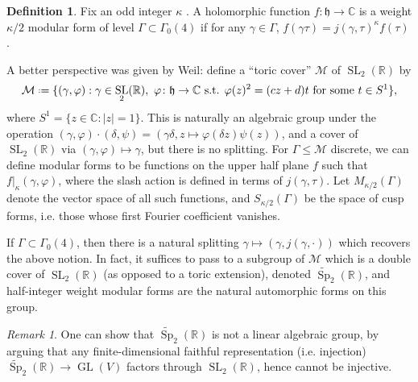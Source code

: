 \documentclass[11pt,a4paper,leqno]{article}
\let\mc\mathcal
\let\mf\mathfrak
\newcommand{\1}{\mathbbm{1}}
\newcommand{\R}{\mathbb{R}}
\newcommand{\C}{\mathbb{C}}
\newcommand*{\defeq}{\mathrel{\vcenter{\baselineskip0.5ex \lineskiplimit0pt
      \hbox{\scriptsize.}\hbox{\scriptsize.}}}%
  =}
\renewcommand{\phi}{\varphi}
\DeclareMathOperator{\SL}{SL}
\DeclareMathOperator{\Sp}{Sp}
\newcommand{\SpC}{\widetilde{\operatorname{\Sp}}}
\DeclareMathOperator{\GL}{GL}
\theoremstyle{plain}
\theoremstyle{definition}
\newtheorem{definition}[theorem]{Definition}
\theoremstyle{remark}
\newtheorem*{remark}{Remark}
\numberwithin{equation}{section}
\begin{document}
\begin{definition}
  Fix an odd integer $\kappa$ . A holomorphic function $f \colon \mf h \to \C$
  is a weight $\kappa/2$ modular form of level $\Gamma \subset \Gamma_{0}(4)$ if for any $\gamma
  \in \Gamma$, $f(\gamma \tau) = j(\gamma,\tau)^{\kappa} f(\tau)$. 
\end{definition}

A better perspective was given by Weil: define a ``toric cover''
$\mc M$ of $\SL_{2}(\R)$ by
\begin{equation}
  \label{eq:3}
\mc M \defeq \{(\gamma, \phi) : \gamma \in \SL_{2}(\R),\ \phi \colon \mf h \to \C \text{
  s.t. } \phi(z)^{2} = (cz+d)t \text{ for some } t \in S^{1}\},
\end{equation}
where $S^{1} = \{z \in \C : |z| = 1\}$. This is naturally an algebraic
group under the operation
$(\gamma,\phi) \cdot (\delta,\psi) = (\gamma \delta, z\mapsto \phi(\delta z)\psi(z))$, and a cover of
$\SL_{2}(\R)$ via $(\gamma,\phi) \mapsto \gamma$, but there is no splitting. For
$\Gamma \le \mc M$ discrete, we can define modular forms to be functions on
the upper half plane $f$ such that $f|_{\kappa}(\gamma,\phi)$, where the slash
action is defined in terms of $j(\gamma,\tau)$. Let
$M_{\kappa/2}(\Gamma)$ denote the vector space of all such functions, and
$S_{\kappa/2}(\Gamma)$ be the space of cusp forms, i.e. those whose first
Fourier coefficient vanishes.

If $\Gamma \subset \Gamma_{0}(4)$, then there is a natural splitting
$\gamma \mapsto (\gamma, j(\gamma,\cdot))$ which recovers the above notion. In fact, it
suffices to pass to a subgroup of $\mc M$ which is a double cover of
$\SL_{2}(\R)$ (as opposed to a toric extension), denoted
$\SpC_{2}(\R)$, and half-integer weight modular forms are
the natural automorphic forms on this group.

\begin{remark}
  One can show that $\SpC_{2}(\R)$ is not a linear
  algebraic group, by arguing that any finite-dimensional faithful
  representation (i.e. injection) $\SpC_{2}(\R) \to \GL(V)$
  factors through $\SL_{2}(\R)$, hence cannot be injective. 
\end{remark}
\end{document}
